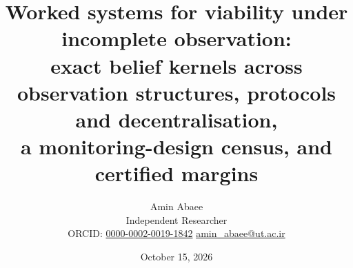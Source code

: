 \documentclass[11pt,a4paper]{article}
\theoremstyle{plain}
\theoremstyle{definition}
\theoremstyle{remark}
\begin{document}
\title{\textbf{Worked systems for viability under incomplete observation:\\ exact belief kernels across observation structures, protocols and decentralisation,\\ a monitoring-design census, and certified margins}}
\author{Amin Abaee\\[0.3em]
{\small Independent Researcher}\\[0.2em]
{\small ORCID: \href{https://orcid.org/0000-0002-0019-1842}{0000-0002-0019-1842}\quad
\href{mailto:amin_abaee@ut.ac.ir}{amin\_abaee@ut.ac.ir}}}
\date{October 15, 2026}
\maketitle

\begin{abstract}
\noindent

\end{abstract}
\end{document}
